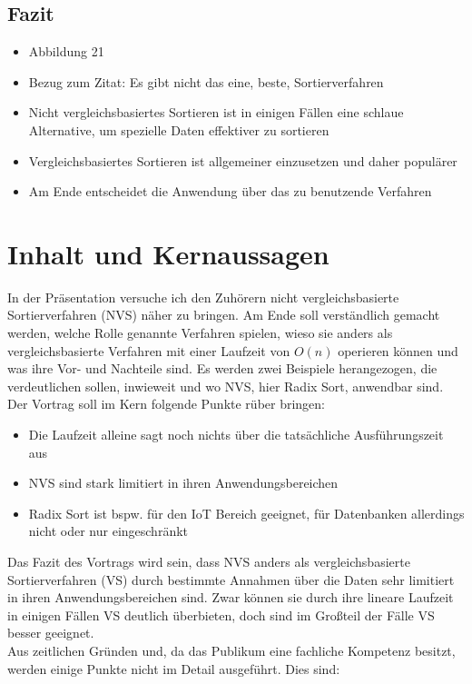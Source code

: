 \documentclass[a4paper, 12pt, oneside]{article}
\begin{document}
    \subsection{Fazit}

   \begin{itemize}
        \item Abbildung 21
        \item Bezug zum Zitat: Es gibt nicht das eine, beste, Sortierverfahren
        \item Nicht vergleichsbasiertes Sortieren ist in einigen Fällen eine schlaue Alternative, um spezielle Daten effektiver zu sortieren
        \item Vergleichsbasiertes Sortieren ist allgemeiner einzusetzen und daher populärer
        \item Am Ende entscheidet die Anwendung über das zu benutzende Verfahren
    \end{itemize}


    \clearpage
    \section{Inhalt und Kernaussagen}

    In der Präsentation versuche ich den Zuhörern nicht vergleichsbasierte Sortierverfahren (NVS)
    näher zu bringen. Am Ende soll verständlich gemacht werden, welche Rolle genannte Verfahren 
    spielen, wieso sie anders als vergleichsbasierte Verfahren mit einer Laufzeit von $O(n)$ operieren 
    können und was ihre Vor- und Nachteile sind. Es werden zwei Beispiele herangezogen, die verdeutlichen 
    sollen, inwieweit und wo NVS, hier Radix Sort, anwendbar sind. \\

    Der Vortrag soll im Kern folgende Punkte rüber bringen:

    \begin{itemize}
        \item Die Laufzeit alleine sagt noch nichts über die tatsächliche Ausführungszeit aus
        \item NVS sind stark limitiert in ihren Anwendungsbereichen
        \item Radix Sort ist bspw. für den IoT Bereich geeignet, für Datenbanken allerdings nicht oder nur eingeschränkt
    \end{itemize}

    Das Fazit des Vortrags wird sein, dass NVS anders als vergleichsbasierte Sortierverfahren (VS) 
    durch bestimmte Annahmen über die Daten sehr limitiert in ihren Anwendungsbereichen sind. 
    Zwar können sie durch ihre lineare Laufzeit in einigen Fällen VS deutlich überbieten, 
    doch sind im Großteil der Fälle VS besser geeignet. \\
    Aus zeitlichen Gründen und, da das Publikum eine fachliche Kompetenz besitzt, werden einige 
    Punkte nicht im Detail ausgeführt. Dies sind:
\end{document}
